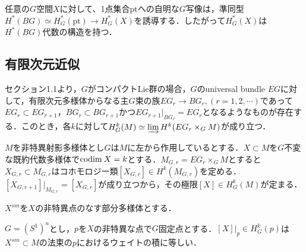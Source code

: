 任意の$G$空間$X$に対して、1点集合$\text{pt}$への自明な$G$写像は，準同型$H^*(BG)\simeq H^*_G(\text{pt})\rightarrow H^*_G(X)$を誘導する．したがって$H^*_G(X)$は$H^*(BG)$代数の構造を持つ．



\subsection{有限次元近似}

セクション1.1より，$G$がコンパクトLie群の場合，$G$のuniversal bundle $EG$に対して，有限次元多様体からなる主$G$束の族$EG_r\rightarrow BG_r, (r=1,2,\cdots)$であって$EG_r\subset EG_{r+1}$，$BG_r\subset BG_{r+1}$かつ$EG_{r+1}|_{BG_r} = EG_r$となるようなものが存在する．このとき，各$k$に対して$H^k_G(M)\simeq \varinjlim H^k(EG_r\times_GM)$が成り立つ．


$M$を非特異射影多様体とし$G$は$M$に左から作用しているとする．$X\subset M$を$G$不変な既約代数多様体で$\text{codim}\: X =k$とする．$M_{G,r}=EG_r\times_GM$とすると$X_{G,r}\subset M_{G,r}$はコホモロジー類$[X_{G,r}]\in H^k(M_{G,r})$を定める\cite{fulton young tableaux}．$[X_{G,r+1}]|_{M_{G,r}} = [X_{G,r}]$が成り立つから，その極限$[X]\in H^k_G(M)$が定まる．

$X^{sm}$を$X$の非特異点のなす部分多様体とする．

\begin{prop}\label{restriction to fixed point}
  $G=(S^1)^n$とし，$p$を$X$の非特異な点で$G$固定点とする．$[X]|_p\in H^k_G(p)$は$X^{sm}\subset M$の法束の$p$におけるウェイトの積に等しい．
\end{prop}

